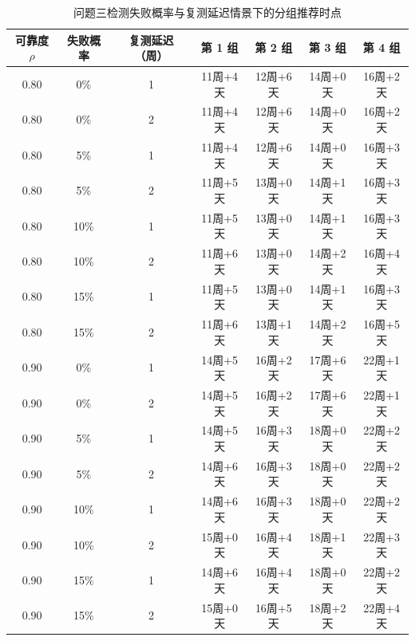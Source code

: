 \begin{table}[!htbp]
  \centering
  \caption{问题三检测失败概率与复测延迟情景下的分组推荐时点}
  \label{tab:a4}
  \small
  \begin{tabular}{@{}ccccccc@{}}
    \toprule
    可靠度 $\rho$ & 失败概率 & 复测延迟（周） & 第 1 组 & 第 2 组 & 第 3 组 & 第 4 组 \\
    \midrule
    0.80 & 0\% & 1 & 11周+4天 & 12周+6天 & 14周+0天 & 16周+2天 \\
    0.80 & 0\% & 2 & 11周+4天 & 12周+6天 & 14周+0天 & 16周+2天 \\
    0.80 & 5\% & 1 & 11周+4天 & 12周+6天 & 14周+0天 & 16周+3天 \\
    0.80 & 5\% & 2 & 11周+5天 & 13周+0天 & 14周+1天 & 16周+3天 \\
    0.80 & 10\% & 1 & 11周+5天 & 13周+0天 & 14周+1天 & 16周+3天 \\
    0.80 & 10\% & 2 & 11周+6天 & 13周+0天 & 14周+2天 & 16周+4天 \\
    0.80 & 15\% & 1 & 11周+5天 & 13周+0天 & 14周+1天 & 16周+3天 \\
    0.80 & 15\% & 2 & 11周+6天 & 13周+1天 & 14周+2天 & 16周+5天 \\
    0.90 & 0\% & 1 & 14周+5天 & 16周+2天 & 17周+6天 & 22周+1天 \\
    0.90 & 0\% & 2 & 14周+5天 & 16周+2天 & 17周+6天 & 22周+1天 \\
    0.90 & 5\% & 1 & 14周+5天 & 16周+3天 & 18周+0天 & 22周+2天 \\
    0.90 & 5\% & 2 & 14周+6天 & 16周+3天 & 18周+0天 & 22周+2天 \\
    0.90 & 10\% & 1 & 14周+6天 & 16周+3天 & 18周+0天 & 22周+2天 \\
    0.90 & 10\% & 2 & 15周+0天 & 16周+4天 & 18周+1天 & 22周+3天 \\
    0.90 & 15\% & 1 & 14周+6天 & 16周+4天 & 18周+0天 & 22周+2天 \\
    0.90 & 15\% & 2 & 15周+0天 & 16周+5天 & 18周+2天 & 22周+4天 \\
    \bottomrule
  \end{tabular}
\end{table}

